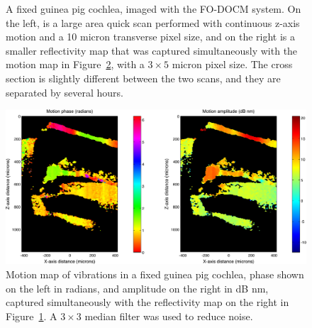 \begin{figure}[h!]
\centering
{}
\caption[A fixed guinea pig cochlea, imaged with the FO-DOCM system.]{A fixed guinea pig cochlea, imaged with the FO-DOCM system. On the left, is a large area quick scan performed with continuous z-axis motion and a 10 micron transverse pixel size, and on the right is a smaller reflectivity map that was captured simultaneously with the motion map in Figure~\ref{fig:motion_map}, with a $3\times5$ micron pixel size. The cross section is slightly different between the two scans, and they are separated by several hours. \label{fig:fixed_refl}}
\end{figure}

\begin{figure}[h!]
\centering
\includegraphics[width=1.03\textwidth]{Images/Results/4-29/motion.png}
\caption[Motion map of vibrations in a fixed guinea pig cochlea.]{Motion map of vibrations in a fixed guinea pig cochlea, phase shown on the left in radians, and amplitude on the right in dB nm, captured simultaneously with the reflectivity map on the right in Figure~\ref{fig:fixed_refl}. A $3\times3$ median filter was used to reduce noise. \label{fig:motion_map}}
\end{figure}


